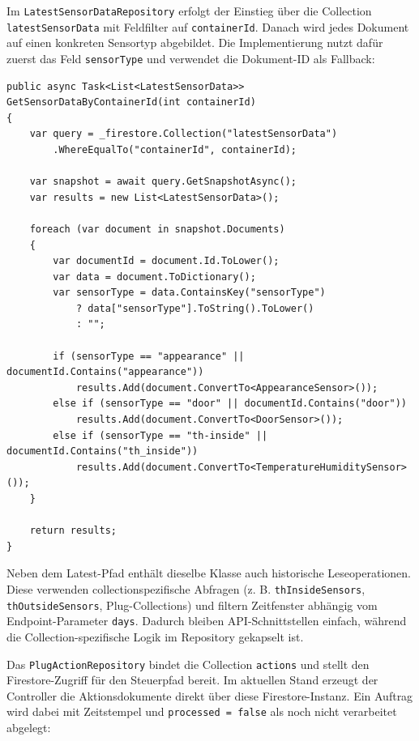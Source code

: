 Im \texttt{LatestSensorDataRepository} erfolgt der Einstieg über die Collection \texttt{latestSensorData} mit Feldfilter auf \texttt{containerId}. Danach wird jedes Dokument auf einen konkreten Sensortyp abgebildet. Die Implementierung nutzt dafür zuerst das Feld \texttt{sensorType} und verwendet die Dokument-ID als Fallback:

\begin{lstlisting}[language={[Sharp]C},caption={Typisierte Latest-Query pro Container},label={lst:db:latest:typed-query},basicstyle=\ttfamily\small,breaklines=true,breakatwhitespace=false,columns=fullflexible]
public async Task<List<LatestSensorData>> GetSensorDataByContainerId(int containerId)
{
    var query = _firestore.Collection("latestSensorData")
        .WhereEqualTo("containerId", containerId);

    var snapshot = await query.GetSnapshotAsync();
    var results = new List<LatestSensorData>();

    foreach (var document in snapshot.Documents)
    {
        var documentId = document.Id.ToLower();
        var data = document.ToDictionary();
        var sensorType = data.ContainsKey("sensorType")
            ? data["sensorType"].ToString().ToLower()
            : "";

        if (sensorType == "appearance" || documentId.Contains("appearance"))
            results.Add(document.ConvertTo<AppearanceSensor>());
        else if (sensorType == "door" || documentId.Contains("door"))
            results.Add(document.ConvertTo<DoorSensor>());
        else if (sensorType == "th-inside" || documentId.Contains("th_inside"))
            results.Add(document.ConvertTo<TemperatureHumiditySensor>());
    }

    return results;
}
\end{lstlisting}

Neben dem Latest-Pfad enthält dieselbe Klasse auch historische Leseoperationen. Diese verwenden collectionspezifische Abfragen (z. B. \texttt{thInsideSensors}, \texttt{thOutsideSensors}, Plug-Collections) und filtern Zeitfenster abhängig vom Endpoint-Parameter \texttt{days}. Dadurch bleiben API-Schnittstellen einfach, während die Collection-spezifische Logik im Repository gekapselt ist.

Das \texttt{PlugActionRepository} bindet die Collection \texttt{actions} und stellt den Firestore-Zugriff für den Steuerpfad bereit. Im aktuellen Stand erzeugt der Controller die Aktionsdokumente direkt über diese Firestore-Instanz. Ein Auftrag wird dabei mit Zeitstempel und \texttt{processed = false} als noch nicht verarbeitet abgelegt:


